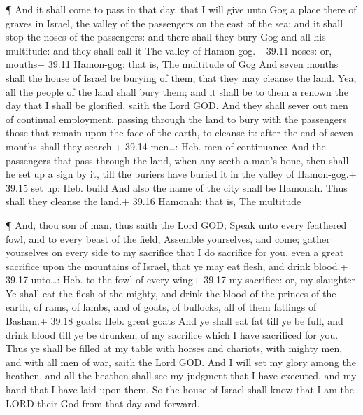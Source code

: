 ¶ And it shall come to pass in that day, that I will give
unto Gog a place there of graves in Israel, the valley of the passengers
on the east of the sea: and it shall stop the noses of the passengers:
and there shall they bury Gog and all his multitude: and they shall call
it The valley of Hamon-gog.+ 39.11 noses: or, mouths+ 39.11 Hamon-gog:
that is, The multitude of Gog  And seven months shall the
house of Israel be burying of them, that they may cleanse the land.
 Yea, all the people of the land shall bury them; and it
shall be to them a renown the day that I shall be glorified, saith the
Lord GOD.  And they shall sever out men of continual
employment, passing through the land to bury with the passengers those
that remain upon the face of the earth, to cleanse it: after the end of
seven months shall they search.+ 39.14 men\ldots: Heb. men of
continuance  And the passengers that pass through the land,
when any seeth a man's bone, then shall he set up a sign by it, till the
buriers have buried it in the valley of Hamon-gog.+ 39.15 set up: Heb.
build  And also the name of the city shall be Hamonah. Thus
shall they cleanse the land.+ 39.16 Hamonah: that is, The multitude

 ¶ And, thou son of man, thus saith the Lord GOD; Speak
unto every feathered fowl, and to every beast of the field, Assemble
yourselves, and come; gather yourselves on every side to my sacrifice
that I do sacrifice for you, even a great sacrifice upon the mountains
of Israel, that ye may eat flesh, and drink blood.+ 39.17 unto\ldots:
Heb. to the fowl of every wing+ 39.17 my sacrifice: or, my slaughter
 Ye shall eat the flesh of the mighty, and drink the blood
of the princes of the earth, of rams, of lambs, and of goats, of
bullocks, all of them fatlings of Bashan.+ 39.18 goats: Heb. great goats
 And ye shall eat fat till ye be full, and drink blood till
ye be drunken, of my sacrifice which I have sacrificed for you.
 Thus ye shall be filled at my table with horses and
chariots, with mighty men, and with all men of war, saith the Lord GOD.
 And I will set my glory among the heathen, and all the
heathen shall see my judgment that I have executed, and my hand that I
have laid upon them.  So the house of Israel shall know
that I am the LORD their God from that day and forward.

